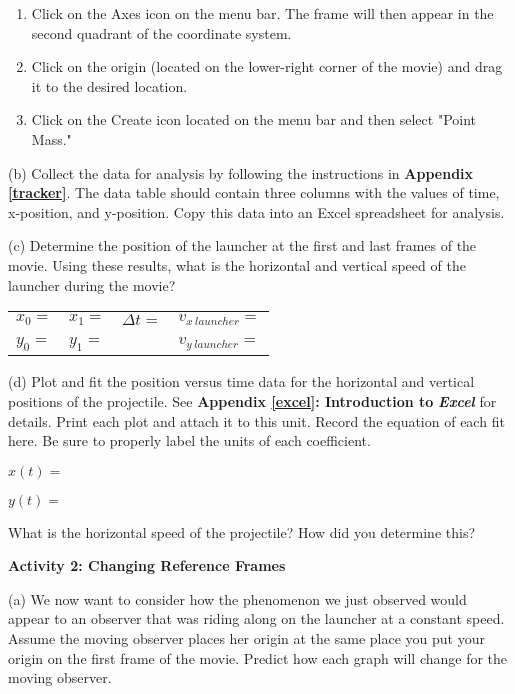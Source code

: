 \begin{enumerate}
\item Click on the Axes icon on the menu bar.
The frame will then appear in the second quadrant of the coordinate system.
\item Click on the origin (located on the lower-right corner of the movie) and drag it to
the desired location.
\item Click on the Create icon located on the menu bar and then select "Point Mass."
\end{enumerate}
(b) Collect the data for analysis by following the instructions in
\textbf{Appendix \ref{tracker}}. The data table should contain three columns with
the values of time, x-position, and y-position. Copy this data into an Excel spreadsheet for analysis.

(c) Determine the position of the launcher at the first and last frames
of the movie. Using these results, what is the horizontal and vertical
speed of the launcher during the movie?

\vspace{0.3cm}
{\centering \begin{tabular}{p{20mm}p{20mm}p{30mm}p{70mm}}
\( x_{0}= \) &
\( x_{1}= \)&
\( \Delta t= \)&
\( v_{x\ launcher}= \) \\
&
&
&
\\
\( y_{0}= \)&
\( y_{1}= \) &
&
\( v_{y\ launcher} =\) \\
\end{tabular}\par}
\vspace{0.3cm}

(d) Plot and fit the position versus time data for the horizontal
and vertical positions of the projectile. See \textbf{Appendix \ref{excel}:
Introduction to} \textbf{\emph{Excel}} for details. Print each
plot and attach it to this unit. Record the equation of each fit here.
Be sure to properly label the units of each coefficient.

$x(t) =$
\vspace*{5mm}

$y(t) =$
\vspace{5mm}

What is the horizontal speed of the projectile? How did you determine
this?
\vspace{2in}

\textbf{Activity 2: Changing Reference Frames}

(a) We now want to consider how the phenomenon we just observed would
appear to an observer that was riding along on the launcher at a constant
speed. Assume the moving observer places her origin at the same place
you put your origin on the first frame of the movie. Predict how each
graph will change for the moving observer.

